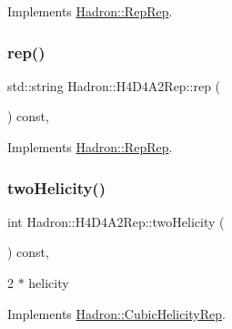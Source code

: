Implements \mbox{\hyperlink{structHadron_1_1RepRep_ab3213025f6de249f7095892109575fde}{Hadron\+::\+Rep\+Rep}}.

\mbox{\label{structHadron_1_1H4D4A2Rep_a3964a2a2df9370ac3176d54fa588eb8a}} 
\subsubsection{\texorpdfstring{rep()}{rep()}\hspace{0.1cm}{\footnotesize\ttfamily [5/5]}}
{\footnotesize\ttfamily std\+::string Hadron\+::\+H4\+D4\+A2\+Rep\+::rep (\begin{DoxyParamCaption}{ }\end{DoxyParamCaption}) const\hspace{0.3cm}{\ttfamily [inline]}, {\ttfamily [virtual]}}



Implements \mbox{\hyperlink{structHadron_1_1RepRep_ab3213025f6de249f7095892109575fde}{Hadron\+::\+Rep\+Rep}}.

\mbox{\label{structHadron_1_1H4D4A2Rep_a6ea29d2750a22f6ef02172b0482e32e5}} 
\subsubsection{\texorpdfstring{twoHelicity()}{twoHelicity()}\hspace{0.1cm}{\footnotesize\ttfamily [1/3]}}
{\footnotesize\ttfamily int Hadron\+::\+H4\+D4\+A2\+Rep\+::two\+Helicity (\begin{DoxyParamCaption}{ }\end{DoxyParamCaption}) const\hspace{0.3cm}{\ttfamily [inline]}, {\ttfamily [virtual]}}

2 $\ast$ helicity 

Implements \mbox{\hyperlink{structHadron_1_1CubicHelicityRep_af507aa56fc2747eacc8cb6c96db31ecc}{Hadron\+::\+Cubic\+Helicity\+Rep}}.

\mbox{\label{structHadron_1_1H4D4A2Rep_a6ea29d2750a22f6ef02172b0482e32e5}} 
